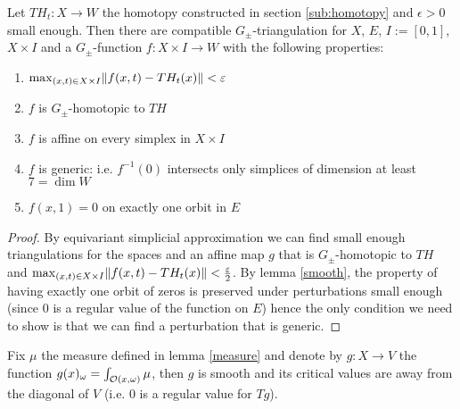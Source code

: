 \documentclass[9pt]{article}
\begin{document}
\begin{lemma}
  \label{generic}

  Let $TH_t: X \rightarrow W$ the homotopy constructed in section \ref{sub:homotopy} and $\epsilon > 0$ small enough. Then there are compatible $G_\pm$-triangulation for $X$, $E$, $I:=[0,1]$, $X\times I$ and a $G_\pm$-function $f:X\times I\rightarrow W$ with the following properties:
  \begin{enumerate}
  \item $\max_{(x,t)\in X\times I} \lVert f(x, t) - TH_t(x) \rVert < \varepsilon$
  \item $f$ is $G_\pm$-homotopic to $TH$
  \item $f$ is affine on every simplex in $X\times I$
  \item $f$ is generic: i.e. $f^{-1}(0)$ intersects only simplices of dimension at least $7=\dim W$
  \item $f(x,1) = 0$ on exactly one orbit in $E$
  \end{enumerate}
\end{lemma}

\begin{proof}
  By equivariant simplicial approximation we can find small enough triangulations for the spaces and an affine map $g$ that is $G_\pm$-homotopic to $TH$ and $\max_{(x,t)\in X\times I} \lVert f(x, t) - TH_t(x) \rVert < \frac{\varepsilon}{2}$.
  By lemma \ref{smooth}, the property of having exactly one orbit of zeros is preserved under perturbations small enough (since $0$ is a regular value of the function on $E$) hence the only condition we need to show is that we can find a perturbation that is generic.
\end{proof}

\begin{lemma}\label{smooth}
  Fix $\mu$ the measure defined in lemma \ref{measure} and denote by $g:X\rightarrow V$ the function $g(x)_\omega = \int_{\mathcal{O}(x, \omega)}\mu$, then $g$ is smooth and its critical values are away from the diagonal of $V$ (i.e. $0$ is a regular value for $Tg$).
\end{lemma}
\end{document}
